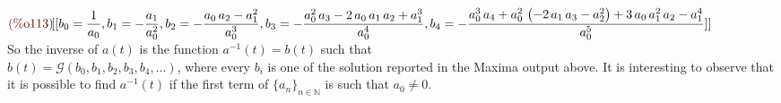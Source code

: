 \begin{math}\displaystyle
  \parbox{8ex}{\color{labelcolor}(\%o113) }
  [[{b}_{0}=\frac{1}{{a}_{0}},{b}_{1}=-\frac{{a}_{1}}{{a}_{0}^{2}},{b}_{2}=-\frac{{a}_{0}\,{a}_{2}-{a}_{1}^{2}}{{a}_{0}^{3}},{b}_{3}=-\frac{{a}_{0}^{2}\,{a}_{3}-2\,{a}_{0}\,{a}_{1}\,{a}_{2}+{a}_{1}^{3}}{{a}_{0}^{4}},\\
  {b}_{4}=-\frac{{a}_{0}^{3}\,{a}_{4}+{a}_{0}^{2}\,\left(
      -2\,{a}_{1}\,{a}_{3}-{a}_{2}^{2}\right)
    +3\,{a}_{0}\,{a}_{1}^{2}\,{a}_{2}-{a}_{1}^{4}}{{a}_{0}^{5}}]]
\end{math}\\
So the inverse of $a(t)$ is the function $a^{-1}(t)= b(t)$ such that\\
$b(t)= \mathcal{G} (b_0, b_1, b_2, b_3, b_4, \ldots )$, where every
$b_i$ is one of the solution reported in the Maxima output above. It
is interesting to observe that it is possible to find $a^{-1}(t)$ if
the first term of $\{a_n\}_{n\in\mathbb{N} } $ is such that $a_0 \not
= 0$.

